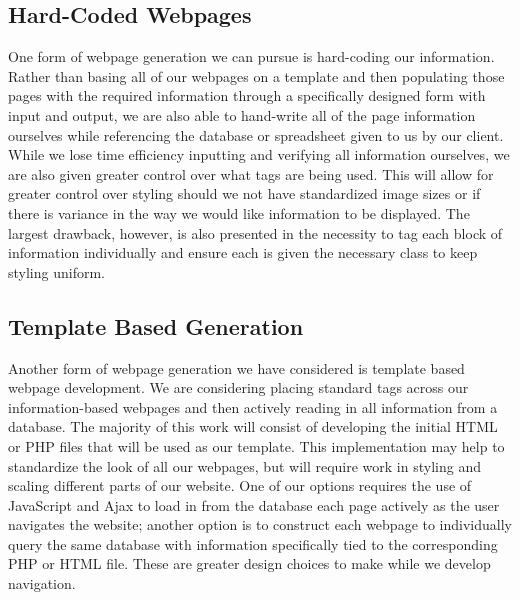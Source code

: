 \documentclass[letterpaper,10pt, draftclsnofoot,onecolumn]{IEEEtran}
\begin{document}
{{{{{{{{{{{{{\subsection[Hard-Coded Webpages]{\color{black}
Hard-Coded Webpages}
{\color{black}\normalsize\noindent
{One form of webpage generation we can pursue is hard-coding our information. 
Rather than basing all of our webpages on a template and then populating those pages with the required information through a specifically designed form with input and output, we are also able to hand-write all of the page information ourselves while referencing the database or spreadsheet given to us by our client.
While we lose time efficiency inputting and verifying all information ourselves, we are also given greater control over what tags are being used. 
This will allow for greater control over styling should we not have standardized image sizes or if there is variance in the way we would like information to be displayed. 
The largest drawback, however, is also presented in the necessity to tag each block of information individually and ensure each is given the necessary class to keep styling uniform.}

\subsection[Template Based Generation]{\color{black}
Template Based Generation}
{\color{black}\normalsize\noindent
{Another form of webpage generation we have considered is template based webpage development.
We are considering placing standard tags across our information-based webpages and then actively reading in all information from a database.
The majority of this work will consist of developing the initial HTML or PHP files that will be used as our template.
This implementation may help to standardize the look of all our webpages, but will require work in styling and scaling different parts of our website\cite{website3}.
One of our options requires the use of JavaScript and Ajax to load in from the database each page actively as the user navigates the website; another option is to construct each webpage to individually query the same database with information specifically tied to the corresponding PHP or HTML file. 
These are greater design choices to make while we develop navigation.}

}}}}}}}}}}}}}}}
\end{document}
